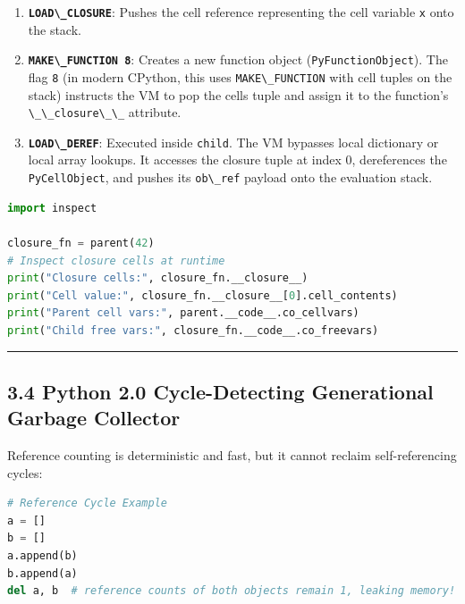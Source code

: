\begin{enumerate}
\def\labelenumi{\arabic{enumi}.}
\tightlist
\item
  \textbf{\passthrough{\lstinline!LOAD\_CLOSURE!}}: Pushes the cell
  reference representing the cell variable \passthrough{\lstinline!x!}
  onto the stack.
\item
  \textbf{\passthrough{\lstinline!MAKE\_FUNCTION 8!}}: Creates a new
  function object (\passthrough{\lstinline!PyFunctionObject!}). The flag
  \passthrough{\lstinline!8!} (in modern CPython, this uses
  \passthrough{\lstinline!MAKE\_FUNCTION!} with cell tuples on the
  stack) instructs the VM to pop the cells tuple and assign it to the
  function's \passthrough{\lstinline!\_\_closure\_\_!} attribute.
\item
  \textbf{\passthrough{\lstinline!LOAD\_DEREF!}}: Executed inside
  \passthrough{\lstinline!child!}. The VM bypasses local dictionary or
  local array lookups. It accesses the closure tuple at index 0,
  dereferences the \passthrough{\lstinline!PyCellObject!}, and pushes
  its \passthrough{\lstinline!ob\_ref!} payload onto the evaluation
  stack.
\end{enumerate}

\begin{lstlisting}[language=Python]
import inspect

closure_fn = parent(42)
# Inspect closure cells at runtime
print("Closure cells:", closure_fn.__closure__)
print("Cell value:", closure_fn.__closure__[0].cell_contents)
print("Parent cell vars:", parent.__code__.co_cellvars)
print("Child free vars:", closure_fn.__code__.co_freevars)
\end{lstlisting}

\begin{center}\rule{0.5\linewidth}{0.5pt}\end{center}

\hypertarget{python-2.0-cycle-detecting-generational-garbage-collector}{%
\subsection{3.4 Python 2.0 Cycle-Detecting Generational Garbage
Collector}\label{python-2.0-cycle-detecting-generational-garbage-collector}}

Reference counting is deterministic and fast, but it cannot reclaim
self-referencing cycles:

\begin{lstlisting}[language=Python]
# Reference Cycle Example
a = []
b = []
a.append(b)
b.append(a)
del a, b  # reference counts of both objects remain 1, leaking memory!
\end{lstlisting}

